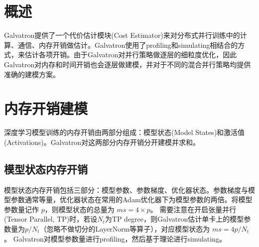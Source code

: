 \documentclass{thuemp}
\begin{document}
\newcommand{\red}[1]{{\textcolor{red}{{#1}}}}
\newcommand{\blue}[1]{{\textcolor{blue}{{#1}}}}
\newcommand{\acheck}[1]{{\textcolor{gray}{{#1}}}}




\twocolumn[
\begin{@twocolumnfalse}
\maketitle



\end{@twocolumnfalse}
]
\wuhao 

\section{概述}
Galvatron提供了一个代价估计模块(Cost Estimator)来对分布式并行训练中的计算、通信、内存开销做估计。Galvatron使用了profiling和simulating相结合的方式，来估计各项开销。由于Galvatron对并行策略做逐层的细粒度优化，因此Galvatron对内存和时间开销也会逐层做建模，并对于不同的混合并行策略均提供准确的建模方案。


\section{内存开销建模}
深度学习模型训练的内存开销由两部分组成：模型状态(Model States)和激活值(Activations)。Galvatron对这两部分内存开销分开建模并求和。
\subsection{模型状态内存开销}
模型状态内存开销包括三部分：模型参数、参数梯度、优化器状态。参数梯度与模型参数通常等量，优化器状态在常用的Adam优化器下为模型参数的两倍。将模型参数量记作 $p$，则模型状态的总量为 $ms=4 \times p$。
需要注意在开启张量并行(Tensor Parallel, TP)时，若设$N_t$为TP degree，则Galvatron估计单卡上的模型参数量为$p/N_t$（忽略不做切分的LayerNorm等算子），对应模型状态为 $ms=4p/N_t$。
Galvatron对模型参数量进行profiling，然后基于理论进行simulating。
\end{document}
